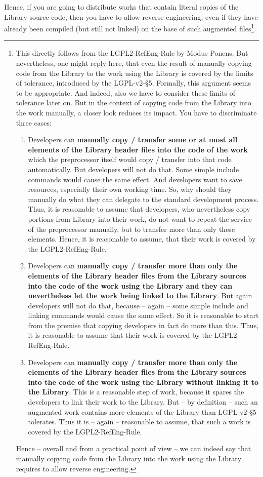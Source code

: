 Hence, if you are going to distribute works that contain literal copies of the
Library source code, then you have to allow reverse engineering, even if they
have already been compiled (but still not linked) on the base of such augmented
files\footnote{This directly follows from the LGPL2-RefEng-Rule by Modus Ponens.
But nevertheless, one might reply here, that even the result of manually copying
code from the Library to the work using the Library is covered by the limits of
tolerance, introduced by the LGPL-v2-§5. Formally, this argument seems to be
appropriate. And indeed, also we have to consider these limits of
tolerance later on. But in the context of copying code from the Library into the
work manually, a closer look reduces its impact. You have to discriminate three
cases:
\begin{enumerate}
  \item Developers can  \textbf{manually copy / transfer some or at most all
  elements of the Library header files into the code of the work} which the
  preprocessor itself would copy / transfer into that code automatically. But
  developers will not do that. Some simple include commands would cause the same
  effect. And developers want to save resources, especially their own working
  time. So, why should they manually do what they can delegate to the standard
  development process. Thus, it is reasonable to assume that developers, who
  nevertheless copy portions from Library into their work, do not want to repeat
  the service of the preprocessor manually, but to transfer more than only these
  elements. Hence, it is reasonable to assume, that their work is covered by the
  LGPL2-RefEng-Rule.
  \item Developers can \textbf{manually copy / transfer more than only the
  elements of the Library header files from the Library sources into the code of
  the work using the Library and they can nevertheless let the work being linked
  to the Library}. But again developers will not do that, because -- again --
  some simple include and linking commands would cause the same effect. So it is
  reasonable to start from the premise that copying developers in fact do more
  than this. Thus, it is reasonable to assume that their work is covered by the
  LGPL2-RefEng-Rule.
  \item Developers can \textbf{manually copy / transfer more than only the
  elements of the Library header files from the Library sources into the code of
  the work using the Library without linking it to the Library}. This is a
  reasonable step of work, because it spares the developers to link their work
  to the Library. But -- by definition -- such an augmented work contains more elements
  of the Library than LGPL-v2-§5 tolerates. Thus it is -- again -- reasonable to
  assume, that such a work is covered by the LGPL2-RefEng-Rule.
\end{enumerate}
Hence -- overall and from a practical point of view -- we can indeed say that
manually copying code from the Library into the work using the Library
requires to allow reverse engineering.}.

